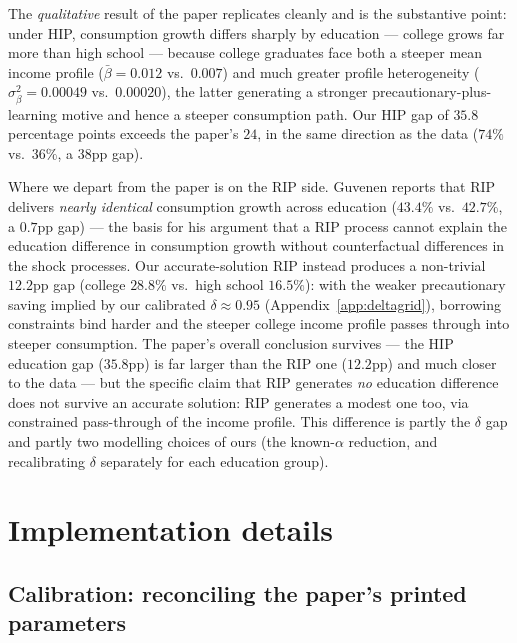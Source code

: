\documentclass[11pt,fleqn]{article}
\begin{document}
The \emph{qualitative} result of the paper replicates cleanly and is the substantive
point: under HIP, consumption growth differs sharply by education --- college grows far
more than high school --- because college graduates face both a steeper mean income profile
($\bar\beta=0.012$ vs.\ $0.007$) and much greater profile heterogeneity
($\sigma^2_\beta=0.00049$ vs.\ $0.00020$), the latter generating a stronger
precautionary-plus-learning motive and hence a steeper consumption path. Our HIP gap of
$35.8$ percentage points exceeds the paper's $24$, in the same direction as the data
($74\%$ vs.\ $36\%$, a $38$pp gap).

Where we depart from the paper is on the RIP side. Guvenen reports that RIP delivers
\emph{nearly identical} consumption growth across education ($43.4\%$ vs.\ $42.7\%$, a
$0.7$pp gap) --- the basis for his argument that a RIP process cannot explain the
education difference in consumption growth without counterfactual differences in the shock
processes. Our accurate-solution RIP instead produces a non-trivial $12.2$pp gap (college
$28.8\%$ vs.\ high school $16.5\%$): with the weaker precautionary saving implied by our
calibrated $\delta\approx0.95$ (Appendix~\ref{app:deltagrid}), borrowing constraints bind
harder and the steeper college income profile passes through into steeper consumption. The
paper's overall conclusion survives --- the HIP education gap ($35.8$pp) is far larger than
the RIP one ($12.2$pp) and much closer to the data --- but the specific claim that RIP
generates \emph{no} education difference does not survive an accurate solution: RIP
generates a modest one too, via constrained pass-through of the income profile. This
difference is partly the $\delta$ gap and partly two modelling choices of ours (the
known-$\alpha$ reduction, and recalibrating $\delta$ separately for each education group).

\appendix

\section{Implementation details}

\subsection{Calibration: reconciling the paper's printed parameters}
\label{app:calib}
\end{document}
